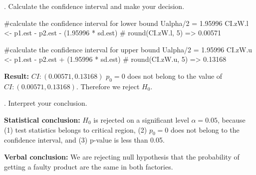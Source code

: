 \documentclass[12pt, oneside]{report}\usepackage[]{graphicx}\usepackage[]{color}
\begin{document}
. Calculate the confidence interval and make your decision.
\begin{Schunk}
\begin{Sinput}
#calculate the confidence interval for lower bound Ualpha/2 = 1.95996
CI.zW.l <- p1.est - p2.est - (1.95996 * sd.est)
# round(CI.zW.l, 5) => 0.00571

#calculate the confidence interval for upper bound Ualpha/2 = 1.95996
CI.zW.u <- p1.est - p2.est + (1.95996 * sd.est)
# round(CI.zW.u, 5) => 0.13168
\end{Sinput}
\end{Schunk}
{\bf Result:} $CI: (0.00571, 0.13168)$ \newline
$p_0 = 0$ does not belong to the value of $CI: (0.00571, 0.13168)$. Therefore we reject $H_0$. \newline

. Interpret your conclusion. \newline

{\bf Statistical conclusion:} \newline
$H_0$ is rejected on a significant level $\alpha = 0.05$, because (1) test statistics belongs to critical region, (2) $p_0 = 0$ does not belong to the confidence interval, and (3) p-value is less than 0.05. \newline 

{\bf Verbal conclusion:} \newline
We are rejecting null hypothesis that the probability of getting a faulty product are the same in both factories.
\end{document}

